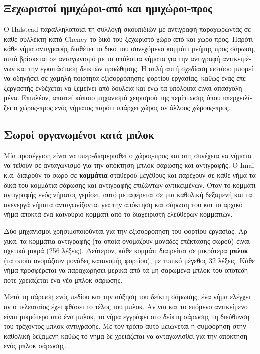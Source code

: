 \begin{greek}
\subsection{Ξεχωριστοί ημιχώροι-από και ημιχώροι-προς}
Ο Halstead \cite{DBLP:conf/lfp/Halstead84} παραλληλοποιεί τη συλλογή σκουπιδιών
με αντιγραφή παραχωρώντας σε κάθε συλλέκτη κατά Cheney το δικό του ξεχωριστό
χώρο-από και χώρο-προς. Παρότι κάθε νήμα αντιγραφής διαθέτει το δικό του συνεχόμενο
κομμάτι μνήμης προς σάρωση, αυτό βρίσκεται σε ανταγωνισμό με τα υπόλοιπα νήματα
για την αντιγραφή αντικειμένων και την εγκατάσταση δεικτών προώθησης. Η απλή αυτή
σχεδίαση ωστόσο μπορεί να οδηγήσει σε χαμηλή ποιότητα εξισορρόπησης
φορτίου εργασίας, καθώς ένας επεξεργαστής ενδέχεται να ξεμείνει από δουλειά και ενώ τα
υπόλοιπα είναι απασχολημένα. Επιπλέον, απαιτεί κάποιο μηχανισμό χειρισμού της
περίπτωσης όπου υπερχειλίζει ο χώρος-προς ενός νήματος παρότι υπάρχει χώρος σε
άλλους χώρους-προς.

\subsection{Σωροί οργανωμένοι κατά μπλοκ}
Μία προσέγγιση είναι να υπερ-διαμερισθεί ο χώρος-προς και στη
συνέχεια να νήματα να τεθούν σε ανταγωνισμό για την απόκτηση
μπλοκ σάρωσης και αντιγραφής. Ο Imai κ.ά. \cite{DBLP:journals/tpds/ImaiT93}
διαιρούν το σωρό σε \textbf{κομμάτια} σταθερού μεγέθους
και παρέχουν σε κάθε νήμα τα δικά του κομμάτια σάρωσης
και αντιγραφής επιζώντων αντικειμένων. Όταν το κομμάτι αντιγραφής
ενός νήματος γεμίσει, αυτό μεταφέρεται σε μια καθολική δεξαμενή
και τα ανενεργά νήματα ανταγωνίζονται για την απόκτηση και
σάρωση του και το αρχικό νήμα αποκτά ένα καινούριο κομμάτι
από το διαχειριστή ελεύθερων κομματιών.

Δύο μηχανισμοί χρησιμοποιούνται για την εξισορρόπηση του φορτίου
εργασίας. Αρχικά, τα κομμάτια αντιγραφής (τα οποία ονομάζουν
μονάδες επέκτασης σωρού) είναι σχετικά μικρά (256 λέξεις). Δεύτερον,
κάθε κομμάτι διαιρείται σε μικρότερα \textbf{μπλοκ} (τα οποία
ονομάζουν μονάδες κατανομής φορτίου), με τυπικό μέγεθος 32 λέξεις.
Κάθε νήμα προσφέρεται να παραχωρήσει μερικά από τα μη σαρωμένα
μπλοκ του οποτεδήποτε χρειάζεται ένα νέο μπλοκ σάρωσης.  

Μετά τη σάρωση ενός πεδίου και την αύξηση του δείκτη σάρωσης, ένα
νήμα ελέγχει αν ο τελευταίος έχει φθάσει το τέλος του μπλοκ. Αν ναι
και το επόμενο αντικείμενο είναι μικρότερο από ένα μπλοκ, το νήμα
εγγράφει στο δείκτη σάρωσης τη διεύθυνση του τρέχοντος μπλοκ αντιγραφής.
Με τον τρόπο αυτό μειώνεται η συμφόρηση στην καθολική δεξαμενή καθώς το
νήμα δε χρειάζεται να ανταγωνισθεί για την απόκτηση ενός μπλοκ σάρωσης.


\end{greek}
